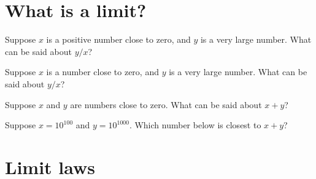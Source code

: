\documentclass{ximera}
\begin{document}
\clearpage

\section{What is a limit?}

\begin{problem}
  Suppose $x$ is a positive number close to zero, and $y$ is a very large number.  What can be said about $y/x$?
  \begin{multipleChoice}
  \end{multipleChoice}
\end{problem}

\begin{problem}
  Suppose $x$ is a number close to zero, and $y$ is a very large number.  What can be said about $y/x$?
  \begin{multipleChoice}
  \end{multipleChoice}
\end{problem}

\begin{problem}
  Suppose $x$ and $y$ are numbers close to zero.  What can be said about $x+y$?
  \begin{multipleChoice}
  \end{multipleChoice}
\end{problem}

\begin{problem}
  Suppose $x = 10^{100}$ and $y = 10^{1000}$.  Which number below is closest to $x + y$?
  \begin{multipleChoice}
  \end{multipleChoice}
\end{problem}

\clearpage

\section{Limit laws}
\end{document}
